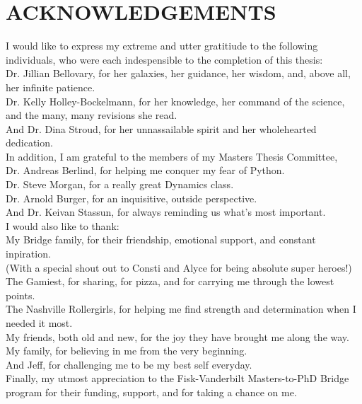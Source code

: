 \documentclass[12pt,headA,chapB]{fiskthesis}
\begin{document}
\chapter*{ACKNOWLEDGEMENTS}
\thispagestyle{empty}
I would like to express my extreme and utter gratitiude to the following individuals, who were each indespensible to the completion of this thesis:\\
	Dr. Jillian Bellovary, for her galaxies, her guidance, her wisdom, and, above all, her infinite patience.\\
	Dr. Kelly Holley-Bockelmann, for her knowledge, her command of the science, and the many, many revisions she read.\\
	And Dr. Dina Stroud, for her unnassailable spirit and her wholehearted dedication.\\

In addition, I am grateful to the members of my Masters Thesis Committee, \\
    Dr. Andreas Berlind, for helping me conquer my fear of Python.\\
    Dr. Steve Morgan, for a really great Dynamics class.\\
    Dr. Arnold Burger, for an inquisitive, outside perspective.\\
    And Dr. Keivan Stassun, for always reminding us what's most important.\\

I would also like to thank:\\
	My Bridge family, for their friendship, emotional support, and constant inpiration.\\
	(With a special shout out to Consti and Alyce for being absolute super heroes!)\\
	The Gamiest, for sharing, for pizza, and for carrying me through the lowest points.\\
	The Nashville Rollergirls, for helping me find strength and determination when I needed it most.\\
	My friends, both old and new, for the joy they have brought me along the way.
	My family, for believing in me from the very beginning.\\
	And Jeff, for challenging me to be my best self everyday.\\

Finally, my utmost appreciation to the Fisk-Vanderbilt Masters-to-PhD Bridge program for their funding, support, and for taking a chance on me.


\renewcommand{\thepage}{}\renewcommand{\thepage}{}

\end{document}
